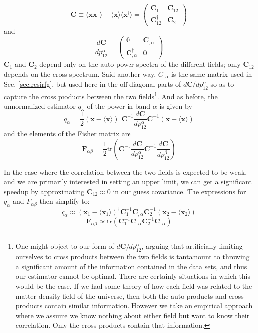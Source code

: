 \documentclass{emulateapj}
\newcommand{\Fb}{\mathbf{F}}
\newcommand{\Cb}{\mathbf{C}}
\newcommand{\xb}{\mathbf{x}}
\begin{document}
\begin{equation}
\Cb\equiv  \langle\xb\xb^\dagger\rangle-\langle\xb\rangle\langle\xb^\dagger\rangle=\left(\begin{matrix}\Cb_1 & \Cb_{12} \\ \Cb_{12}^\dagger & \Cb_2   \end{matrix}\right)
\end{equation}
and 
\begin{equation}
\frac{d\Cb}{dp_{12}^\alpha}=\left(\begin{matrix}\mathbf{0} & \Cb_{,\alpha}\\ \Cb_{,\alpha}^\dagger & \mathbf{0}   \end{matrix}\right)
\end{equation}
$\Cb_1$ and $\Cb_2$ depend only on the auto power spectra of the different fields; only $\Cb_{12}$ depends on the cross spectrum. Said another way, $C_{,\alpha}$ is the same matrix used in Sec. \ref{sec:resirfg}, but used here in the off-diagonal parts of $d\Cb/dp_{12}^\alpha$ so as to capture the cross products between the two fields\footnote{One might object to our form of $d\Cb/dp_{12}^\alpha$, arguing that artificially limiting ourselves to cross products between the two fields is tantamount to throwing a significant amount of the information contained in the data sets, and thus our estimator cannot be optimal. There are certainly situations in which this would be the case. If we had some theory of how each field was related to the matter density field of the universe, then both the auto-products and cross-products contain similar information. However we take an empirical approach where we assume we know nothing about either field but want to know their correlation. Only the cross products contain that information.}. And as before, the unnormalized estimator $q_\alpha$ of the power in band $\alpha$ is given by
\begin{equation}
q_\alpha = \frac{1}{2}(\xb-\langle\xb\rangle)^\dagger \Cb^{-1} \frac{d\Cb}{dp_{12}^\alpha}\Cb^{-1}(\xb-\langle\xb\rangle)
\end{equation}
and the elements of the Fisher matrix are
\begin{equation}
\Fb_{\alpha\beta}=\frac{1}{2}\text{tr}\left(\Cb^{-1} \frac{d\Cb}{dp_{12}^\alpha} \Cb^{-1}  \frac{d\Cb}{dp_{12}^\beta}  \right)	
\end{equation}

In the case where the correlation between the two fields is expected to be weak, and we are primarily interested in setting an upper limit, we can get a significant speedup by approximating $\Cb_{12}\approx0$ in our guess covariance. The expressions for $q_\alpha$ and $F_{\alpha\beta}$ then simplify to:
\begin{equation}
q_\alpha \approx (\xb_1-\langle\xb_1\rangle)^\dagger \Cb_1^{-1} \Cb_{,\alpha}\Cb_2^{-1}(\xb_2-\langle\xb_2\rangle)
\end{equation}
\begin{equation}
\Fb_{\alpha\beta}\approx\text{tr}\left(\Cb_1^{-1} \Cb_{,\alpha} \Cb_2^{-1}  \Cb_{,\alpha}  \right)	
\end{equation}
\end{document}
